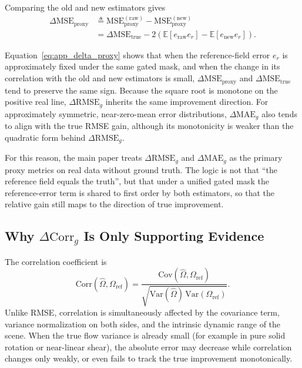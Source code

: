\documentclass[lettersize,journal,onecolumn]{IEEEtran}
\newcommand{\Var}{\mathrm{Var}}
\newcommand{\E}{\mathbb{E}}
\newcommand{\Cov}{\mathrm{Cov}}
\newcommand{\MSE}{\mathrm{MSE}}
\begin{document}
Comparing the old and new estimators gives
\begin{align}
  \Delta \MSE_{\mathrm{proxy}}
  &\triangleq \MSE_{\mathrm{proxy}}^{(\mathrm{raw})}
    - \MSE_{\mathrm{proxy}}^{(\mathrm{new})} \nonumber\\
  &= \Delta \MSE_{\mathrm{true}}
  - 2\!\left(\E[e_{\mathrm{raw}}e_r]-\E[e_{\mathrm{new}}e_r]\right).
  \label{eq:app_delta_proxy}
\end{align}

Equation~\eqref{eq:app_delta_proxy} shows that when the reference-field error
$e_r$ is approximately fixed under the same gated mask,
and when the change in its correlation with the old and new estimators is small,
$\Delta \MSE_{\mathrm{proxy}}$ and $\Delta \MSE_{\mathrm{true}}$
tend to preserve the same sign.
Because the square root is monotone on the positive real line,
$\Delta \mathrm{RMSE}_g$ inherits the same improvement direction.
For approximately symmetric, near-zero-mean error distributions,
$\Delta \mathrm{MAE}_g$ also tends to align with the true RMSE gain,
although its monotonicity is weaker than the quadratic form behind
$\Delta \mathrm{RMSE}_g$.

For this reason, the main paper treats
$\Delta \mathrm{RMSE}_g$ and
$\Delta \mathrm{MAE}_g$
as the primary proxy metrics on real data without ground truth.
The logic is not that ``the reference field equals the truth'',
but that under a unified gated mask the reference-error term is shared to first
order by both estimators, so that the relative gain still maps to the direction
of true improvement.

\subsection{Why $\Delta \mathrm{Corr}_g$ Is Only Supporting Evidence}

The correlation coefficient is
\begin{equation}
  \mathrm{Corr}\!\left(\hat{\Omega},\Omega_{\mathrm{ref}}\right)
  = \frac{\Cov(\hat{\Omega},\Omega_{\mathrm{ref}})}
  {\sqrt{\Var(\hat{\Omega})\,\Var(\Omega_{\mathrm{ref}})}}.
  \label{eq:app_corr}
\end{equation}
Unlike RMSE, correlation is simultaneously affected by the covariance term,
variance normalization on both sides,
and the intrinsic dynamic range of the scene.
When the true flow variance is already small
(for example in pure solid rotation or near-linear shear),
the absolute error may decrease while correlation changes only weakly,
or even fails to track the true improvement monotonically.
\end{document}
